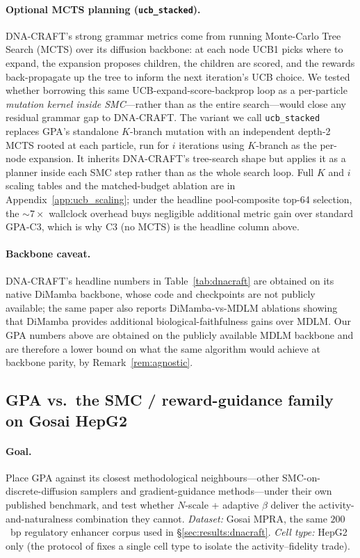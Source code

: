 \documentclass{article}
\theoremstyle{definition}
\theoremstyle{remark}
\newcommand{\gpa}{\textsc{GPA}\xspace}
\newcommand{\dnacraft}{\textsc{DNA-CRAFT}\xspace}
\begin{document}
\paragraph{Optional MCTS planning (\texttt{ucb\_stacked}).}
\dnacraft{}'s strong grammar metrics come from running Monte-Carlo Tree Search (MCTS) over its diffusion backbone: at each node UCB1 picks where to expand, the expansion proposes children, the children are scored, and the rewards back-propagate up the tree to inform the next iteration's UCB choice. We tested whether borrowing this same UCB-expand-score-backprop loop as a per-particle \emph{mutation kernel inside SMC}—rather than as the entire search—would close any residual grammar gap to \dnacraft{}. The variant we call \texttt{ucb\_stacked} replaces \gpa{}'s standalone $K$-branch mutation with an independent depth-2 MCTS rooted at each particle, run for $i$ iterations using $K$-branch as the per-node expansion. It inherits \dnacraft{}'s tree-search shape but applies it as a planner inside each SMC step rather than as the whole search loop. Full $K$ and $i$ scaling tables and the matched-budget ablation are in Appendix~\ref{app:ucb_scaling}; under the headline pool-composite top-64 selection, the $\sim\!7\times$ wallclock overhead buys negligible additional metric gain over standard \gpa{}-C3, which is why C3 (no MCTS) is the headline column above.

\paragraph{Backbone caveat.}
\dnacraft{}'s headline numbers in Table~\ref{tab:dnacraft} are obtained on its native DiMamba backbone, whose code and checkpoints are not publicly available; the same paper also reports DiMamba-vs-MDLM ablations showing that DiMamba provides additional biological-faithfulness gains over MDLM. Our \gpa{} numbers above are obtained on the publicly available MDLM backbone and are therefore a lower bound on what the same algorithm would achieve at backbone parity, by Remark~\ref{rem:agnostic}.

\subsection{GPA vs.\ the SMC / reward-guidance family on Gosai HepG2}\label{sec:results:smc}

\paragraph{Goal.}
Place \gpa{} against its closest methodological neighbours---other SMC-on-discrete-diffusion samplers and gradient-guidance methods---under their own published benchmark, and test whether $N$-scale + adaptive $\beta$ deliver the activity-and-naturalness combination they cannot. \emph{Dataset:} Gosai MPRA, the same $200$~bp regulatory enhancer corpus used in \S\ref{sec:results:dnacraft}. \emph{Cell type:} HepG2 only (the protocol of \citealt{paniouli2025} fixes a single cell type to isolate the activity--fidelity trade).
\end{document}
